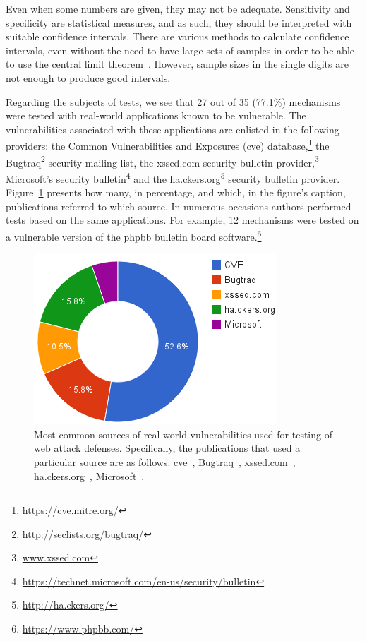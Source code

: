 \documentclass[10pt,journal,compsoc]{IEEEtran}
\begin{document}
Even when some numbers are given, they may not be adequate.
Sensitivity and specificity are statistical measures, and as such,
they should be interpreted with suitable confidence intervals. There are
various methods to calculate confidence intervals, even without
the need to have large sets of samples in order to be able to use the
central limit theorem~\cite{agresti1998,brown2001}.
However, sample sizes in the single
digits are not enough to produce good intervals.

Regarding the subjects of tests,
we see that 27 out of 35 (77.1\%)
mechanisms were tested with real-world
applications known to be vulnerable.
The vulnerabilities associated with these applications
are enlisted in the following providers: the Common
Vulnerabilities and Exposures ({\sc cve})
database,\footnote{\url{https://cve.mitre.org/}}
the Bugtraq\footnote{\url{http://seclists.org/bugtraq/}}
security mailing list,
the {\sc xss}ed.com
security bulletin provider,\footnote{\url{www.xssed.com}}
Microsoft's security
bulletin\footnote{\url{https://technet.microsoft.com/en-us/security/bulletin}}
and the
ha.ckers.org\footnote{\url{http://ha.ckers.org/}}
security bulletin provider.
Figure~\ref{fig:defect_sources} presents how many, in percentage,
and which, in the figure's caption, publications referred
to which source.
In numerous occasions authors performed tests based
on the same applications.
For example, 12 mechanisms were tested on a
vulnerable version of the {\sc phpbb} bulletin board
software.\footnote{\url{https://www.phpbb.com/}}

\begin{figure}[t]
\begin{center}
\leavevmode
\includegraphics[scale=0.47]{defect-percentages.png}
\end{center}
\caption{\label{fig:defect_sources}Most common sources of real-world vulnerabilities
used for testing of web attack defenses.
Specifically, the publications that used a particular source are as follows:
{\sc cve}~\cite{XBS06,NLC07,PMP11,BK04,BV08,JB07,SMS13,WPLKK09,JKK06a,PS11},
Bugtraq~\cite{PB05,KKVJ06,JEP08},
{\sc xss}ed.com~\cite{NSS06,APKLM10},
ha.ckers.org~\cite{TNH07,PSC09,LV09},
Microsoft~\cite{RDWDE07}.}
\end{figure}
\end{document}
